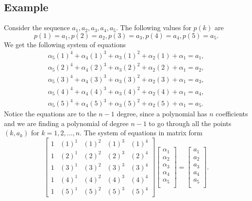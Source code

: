 \documentclass[12pt]{amsart}
\begin{document}
\subsection{Example}
Consider the sequence $a_1, a_2, a_3, a_4, a_5$.
The following values for $p(k)$ are
\begin{equation*}
p(1)=a_1, p(2)=a_2, p(3)=a_3, p(4)=a_4, p(5)=a_5.
\end{equation*}
We get the following system of equations
\begin{equation*}
\begin{array}{l}
\alpha_5(1)^4+\alpha_4(1)^3+\alpha_3(1)^2+\alpha_2(1)+\alpha_1=a_1 ,\\
\alpha_5(2)^4+\alpha_4(2)^3+\alpha_3(2)^2+\alpha_2(2)+\alpha_1=a_2 ,\\
\alpha_5(3)^4+\alpha_4(3)^3+\alpha_3(3)^2+\alpha_2(3)+\alpha_1=a_3 , \\
\alpha_5(4)^4+\alpha_4(4)^3+\alpha_3(4)^2+\alpha_2(4)+\alpha_1=a_4 ,\\
\alpha_5(5)^4+\alpha_4(5)^3+\alpha_3(5)^2+\alpha_2(5)+\alpha_1=a_5.
\end{array}
\end{equation*}
Notice the equations are to the $n-1$ degree, since a polynomial has $n$ coefficients and we are finding a polynomial of degree $n-1$ to go through all the points $(k,a_k)$ for $k=1, 2,\hdots,n$.
The system of equations in matrix form
\begin{equation*}
\left[ {\begin{array}{ccccc}
1 & (1)^1 & (1)^2 & (1)^3 & (1)^4 \\
1 & (2)^1 & (2)^2 & (2)^3 & (2)^4 \\
1 & (3)^1 & (3)^2 & (3)^3 & (3)^4 \\
1 & (4)^1 & (4)^2 & (4)^3 & (4)^4 \\
1 & (5)^1 & (5)^2 & (5)^3 & (5)^4
\end{array} } \right]
\left[ {\begin{array}{c}
\alpha_1 \\
\alpha_2 \\
\alpha_3 \\
\alpha_4 \\
\alpha_5 \\
\end{array} } \right]=
\left[ {\begin{array}{c}
a_1 \\
a_2 \\
a_3\\
a_4\\
a_5\\
\end{array} } \right].
\end{equation*}
\end{document}
